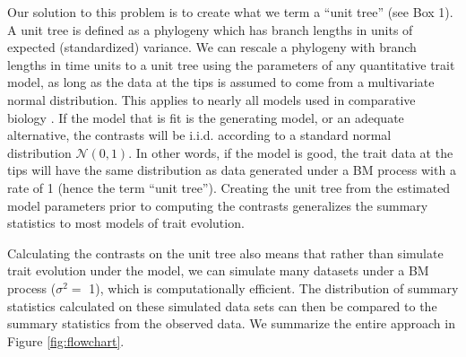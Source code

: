 \documentclass[a4paper,12pt]{article}
\begin{document}
Our solution to this problem is to create what we term a ``unit tree'' (see Box 1). A unit tree is defined as a phylogeny which has branch lengths in units of expected (standardized) variance. We can rescale a phylogeny with branch lengths in time units to a unit tree using the parameters of any quantitative trait model, as long as the data at the tips is assumed to come from a multivariate normal distribution. This applies to nearly all models used in comparative biology \citep{Omeara2012}. If the model that is fit is the generating model, or an adequate alternative, the contrasts will be i.i.d. according to a standard normal distribution $\mathcal{N}(0,1)$. In other words, if the model is good, the trait data at the tips will have the same distribution as data generated under a BM process with a rate of 1 (hence the term ``unit tree''). Creating the unit tree from the estimated model parameters prior to computing the contrasts generalizes the summary statistics to most models of trait evolution.

Calculating the contrasts on the unit tree also means that rather than simulate trait evolution under the model, we can simulate many datasets under a BM process ($\sigma^2 =$ 1), which is computationally efficient. The distribution of summary statistics calculated on these simulated data sets can then be compared to the summary statistics from the observed data. We summarize the entire approach in Figure \ref{fig:flowchart}.
\end{document}
